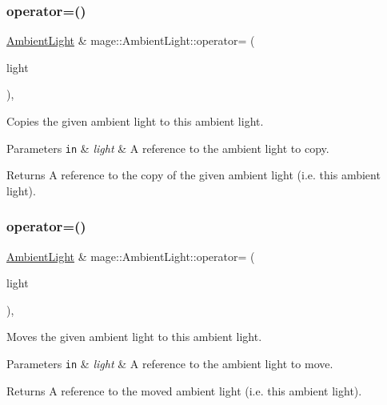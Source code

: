 \subsubsection{\texorpdfstring{operator=()}{operator=()}\hspace{0.1cm}{\footnotesize\ttfamily [1/2]}}
{\footnotesize\ttfamily \hyperlink{classmage_1_1_ambient_light}{Ambient\+Light} \& mage\+::\+Ambient\+Light\+::operator= (\begin{DoxyParamCaption}\item[{const \hyperlink{classmage_1_1_ambient_light}{Ambient\+Light} \&}]{light }\end{DoxyParamCaption})\hspace{0.3cm}{\ttfamily [default]}, {\ttfamily [noexcept]}}

Copies the given ambient light to this ambient light.


\begin{DoxyParams}[1]{Parameters}
\mbox{\tt in}  & {\em light} & A reference to the ambient light to copy. \\
\hline
\end{DoxyParams}
\begin{DoxyReturn}{Returns}
A reference to the copy of the given ambient light (i.\+e. this ambient light). 
\end{DoxyReturn}
\hypertarget{classmage_1_1_ambient_light_ab12de420bef6074ef3ed3c4986d18621}{}\label{classmage_1_1_ambient_light_ab12de420bef6074ef3ed3c4986d18621} 
\subsubsection{\texorpdfstring{operator=()}{operator=()}\hspace{0.1cm}{\footnotesize\ttfamily [2/2]}}
{\footnotesize\ttfamily \hyperlink{classmage_1_1_ambient_light}{Ambient\+Light} \& mage\+::\+Ambient\+Light\+::operator= (\begin{DoxyParamCaption}\item[{\hyperlink{classmage_1_1_ambient_light}{Ambient\+Light} \&\&}]{light }\end{DoxyParamCaption})\hspace{0.3cm}{\ttfamily [default]}, {\ttfamily [noexcept]}}

Moves the given ambient light to this ambient light.


\begin{DoxyParams}[1]{Parameters}
\mbox{\tt in}  & {\em light} & A reference to the ambient light to move. \\
\hline
\end{DoxyParams}
\begin{DoxyReturn}{Returns}
A reference to the moved ambient light (i.\+e. this ambient light). 
\end{DoxyReturn}
\hypertarget{classmage_1_1_ambient_light_aac9a833f2261eaa1bf5eaab7608fc878}{}\label{classmage_1_1_ambient_light_aac9a833f2261eaa1bf5eaab7608fc878} 
